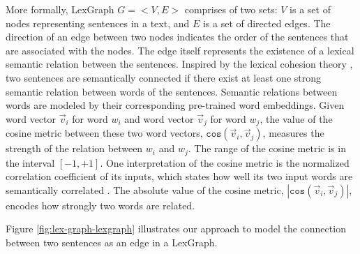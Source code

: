 More formally, LexGraph $G=<V,E>$ comprises of two sets: $V$ is a set of nodes representing sentences in a text, and $E$ is a set of directed edges. 
The direction of an edge between two nodes indicates the order of the sentences that are associated with the nodes. 
The edge itself represents the existence of a lexical semantic relation between the sentences. 
Inspired by the lexical cohesion theory \cite{halliday76}, two sentences are semantically connected if there exist at least one strong semantic relation between words of the sentences. 
Semantic relations between words are modeled by their corresponding pre-trained word embeddings.  
Given word vector $\vec{v}_i$ for word $w_i$ and word vector $\vec{v}_j$ for word $w_j$, the value of the cosine metric between these two word vectors, $\mathtt{cos}(\vec{v}_i,\vec{v}_j)$, measures the strength of the relation between $w_i$ and $w_j$. 
The range of the cosine metric is in the interval $\left[ -1, +1 \right]$.  
One interpretation of the cosine metric is the normalized correlation coefficient of its inputs, which states how well its two input words are semantically correlated \cite{manning99}. 
The absolute value of the cosine metric, $|\mathtt{cos}(\vec{v}_i,\vec{v}_j)|$, encodes how strongly two words are related.  

Figure \ref{fig:lex-graph-lexgraph} illustrates our approach to model the connection between two sentences as an edge in a LexGraph. 

